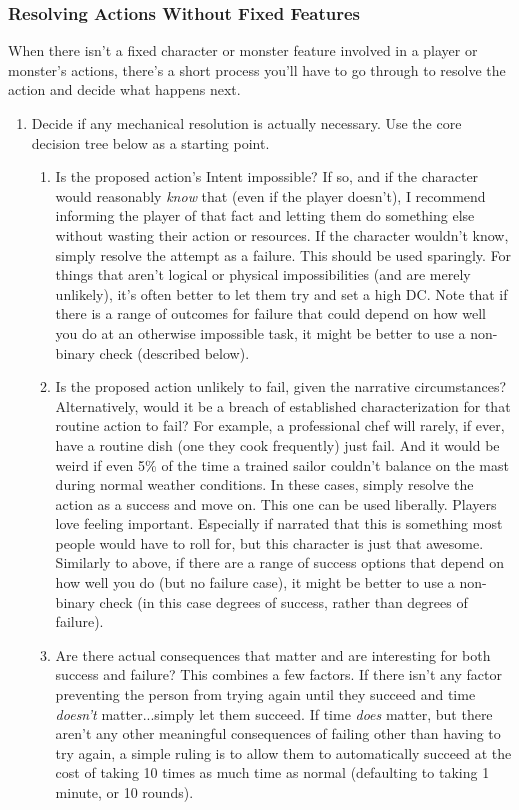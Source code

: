 \documentclass[10pt,twoside,openany,bg=none]{dndbook}
\begin{document}
\subsubsection{Resolving Actions Without Fixed Features}
When there isn't a fixed character or monster feature involved in a player or monster's actions, there's a short process you'll have to go through to resolve the action and decide what happens next.
\begin{enumerate}
    \item Decide if any mechanical resolution is actually necessary. Use the core decision tree below as a starting point.
    \begin{enumerate}
        \item Is the proposed action's Intent impossible? If so, and if the character would reasonably \textit{know} that (even if the player doesn't), I recommend informing the player of that fact and letting them do something else without wasting their action or resources. If the character wouldn't know, simply resolve the attempt as a failure. This should be used sparingly. For things that aren't logical or physical impossibilities (and are merely unlikely), it's often better to let them try and set a high DC. Note that if there is a range of outcomes for failure that could depend on how well you do at an otherwise impossible task, it might be better to use a non-binary check (described below).
        \item Is the proposed action unlikely to fail, given the narrative circumstances? Alternatively, would it be a breach of established characterization for that routine action to fail? For example, a professional chef will rarely, if ever, have a routine dish (one they cook frequently) just fail. And it would be weird if even 5\% of the time a trained sailor couldn't balance on the mast during normal weather conditions. In these cases, simply resolve the action as a success and move on. This one can be used liberally. Players love feeling important. Especially if narrated that this is something most people would have to roll for, but this character is just that awesome. Similarly to above, if there are a range of success options that depend on how well you do (but no failure case), it might be better to use a non-binary check (in this case degrees of success, rather than degrees of failure).
        \item Are there actual consequences that matter and are interesting for both success and failure? This combines a few factors. If there isn't any factor preventing the person from trying again until they succeed and time \textit{doesn't} matter...simply let them succeed. If time \textit{does} matter, but there aren't any other meaningful consequences of failing other than having to try again, a simple ruling is to allow them to automatically succeed at the cost of taking 10 times as much time as normal (defaulting to taking 1 minute, or 10 rounds).

\end{enumerate}
\end{enumerate}
\end{document}
